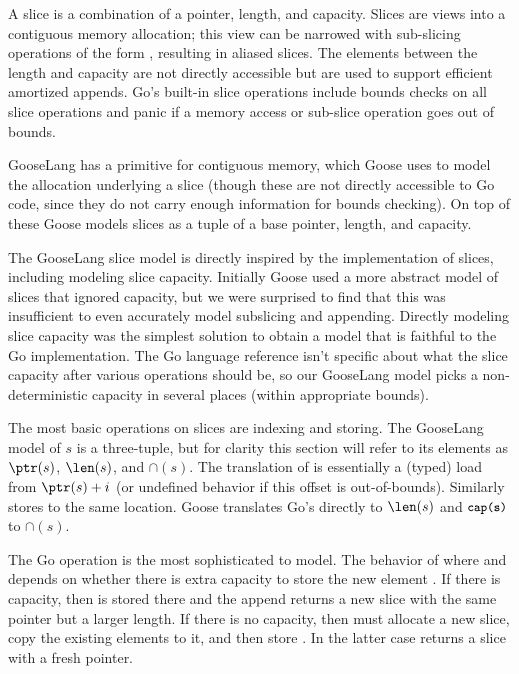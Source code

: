 A slice is a combination of a pointer, length, and capacity. Slices are
views into a contiguous memory allocation; this view can be narrowed
with sub-slicing operations of the form , resulting
in aliased slices. The elements between the length and capacity are not
directly accessible but are used to support efficient amortized appends.
Go's built-in slice operations include bounds checks on all slice
operations and panic if a memory access or sub-slice operation goes out
of bounds.

GooseLang has a primitive for contiguous memory, which Goose uses to model
the allocation underlying a slice (though these are not directly
accessible to Go code, since they do not carry enough information for
bounds checking). On top of these Goose models slices as a tuple of a base
pointer, length, and capacity.

The GooseLang slice model is directly inspired by the implementation of
slices, including modeling slice capacity. Initially Goose used a more
abstract model of slices that ignored capacity, but we were surprised to find that this was insufficient to
even accurately model subslicing and appending. Directly modeling slice
capacity was the simplest solution to obtain a model that is faithful to
the Go implementation. The Go language reference isn't specific about
what the slice capacity after various operations should be, so our
GooseLang model picks a non-deterministic capacity in several places
(within appropriate bounds).


The most basic operations on slices are indexing and storing. The
GooseLang model of $s$ is a three-tuple, but for clarity this section will refer
to its elements as $\ptr(s)$, $\len(s)$, and $\cap(s)$. The
translation of  is essentially a (typed) load from
$\ptr(s) + i$ (or undefined behavior if this offset is out-of-bounds).
Similarly  stores to the same location. Goose translates Go's
 directly to $\len(s)$ and $\cc{cap(s)}$ to $\cap(s)$.

The Go  operation is the most sophisticated to model. The
behavior of  where  and
 depends on whether there is extra capacity to store the
new element . If there is capacity, then  is stored
there and the append returns a new slice with the same pointer but a
larger length. If there is no capacity, then  must
allocate a new slice, copy the existing elements to it, and then store
. In the latter case  returns a slice with a
fresh pointer.

